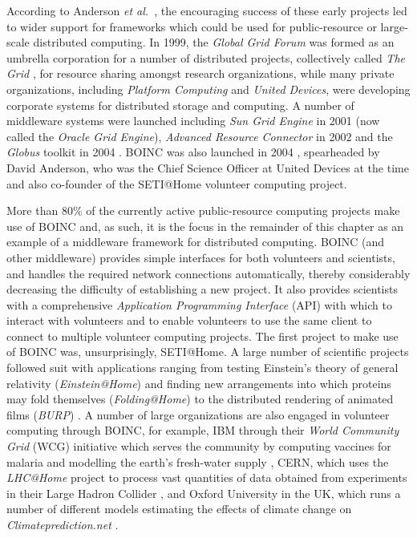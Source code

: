 According to Anderson \emph{et al.\ }\cite{anderson:seti2002}, the encouraging success of these early projects led to  wider support for frameworks which could be used for public-resource or large-scale distributed computing. In 1999, the \emph{Global Grid Forum} was formed as an umbrella corporation for a number of distributed projects, collectively called \emph{The Grid} \cite{fostergrid}, for resource sharing amongst research organizations, while many private organizations, including \emph{Platform Computing} and \emph{United Devices}, were developing corporate systems for distributed storage and computing. A number of middleware systems were launched including \emph{Sun Grid Engine} in 2001 \cite{oracle} (now called the \emph{Oracle Grid Engine}), \emph{Advanced Resource Connector} in 2002 \cite{arc} and the \emph{Globus} toolkit in 2004 \cite{globus}. BOINC was also launched in 2004 \cite{anderson2004boinc}, spearheaded by David Anderson, who was the Chief Science Officer   at United Devices at the time and also co-founder of the SETI@Home volunteer computing project. 

More than 80\% of the currently active public-resource computing projects make use of BOINC and, as such, it is the focus in the remainder of this chapter as an example of a middleware framework for distributed computing. BOINC (and other middleware) provides simple interfaces for both volunteers and scientists, and handles the required network connections automatically, thereby considerably decreasing the difficulty of establishing a new project. It also  provides scientists with a comprehensive \emph{Application Programming Interface} (API) with which to interact with volunteers and to enable volunteers to use the same client to connect to multiple volunteer computing projects. The first project to make use of BOINC was, unsurprisingly, SETI@Home. A large number of scientific projects followed suit with applications ranging from testing Einstein's theory of general relativity (\emph{Einstein@Home}) \cite{eah} and finding new arrangements into which proteins may fold themselves (\emph{Folding@Home}) \cite{fah} to the distributed rendering of animated films (\emph{BURP}) \cite{burp}.
A number of large organizations are also  engaged in volunteer computing through BOINC, for example,    IBM through their \emph{World Community Grid} (WCG) initiative which serves the community by computing vaccines for malaria and modelling the earth's fresh-water supply \cite{wcg}, CERN, which uses the \emph{LHC@Home} project to process  vast quantities of data obtained from experiments in their {Large Hadron Collider} \cite{lhcah}, and Oxford University in the UK, which  runs a number of different models estimating the effects of climate change on \emph{Climateprediction.net} \cite{cpdn}.  

